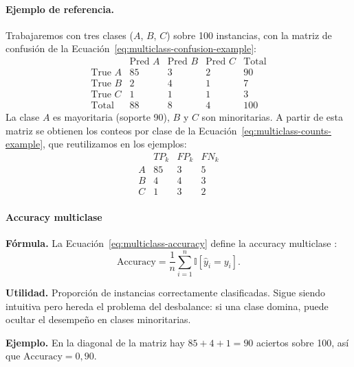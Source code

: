 \documentclass[12pt,oneside]{report}
\newcommand{\ind}{\mathbb{I}} %
\begin{document}
\paragraph{Ejemplo de referencia.} Trabajaremos con tres clases ($A$,
$B$, $C$) sobre 100 instancias, con la matriz de confusión de la Ecuación~\eqref{eq:multiclass-confusion-example}:
\begin{equation}
\label{eq:multiclass-confusion-example}
\begin{array}{l|ccc|c}
 & \text{Pred }A & \text{Pred }B & \text{Pred }C & \text{Total} \\
\hline
\text{True }A & 85 & 3 & 2 & 90 \\
\text{True }B & 2  & 4 & 1 & 7  \\
\text{True }C & 1  & 1 & 1 & 3  \\
\hline
\text{Total} & 88 & 8 & 4 & 100
\end{array}
\end{equation}
La clase $A$ es mayoritaria (soporte 90), $B$ y $C$ son minoritarias.
A partir de esta matriz se obtienen los conteos por clase de la Ecuación~\eqref{eq:multiclass-counts-example}, que
reutilizamos en los ejemplos:
\begin{equation}
\label{eq:multiclass-counts-example}
\begin{array}{l|ccc}
 & TP_k & FP_k & FN_k \\
\hline
A & 85 & 3 & 5 \\
B & 4  & 4 & 3 \\
C & 1  & 3 & 2
\end{array}
\end{equation}

\paragraph{Accuracy multiclase}

\textbf{Fórmula.} La Ecuación~\eqref{eq:multiclass-accuracy} define la accuracy multiclase \cite{sokolova_lapalme_2009}:
\begin{equation}
\label{eq:multiclass-accuracy}
\mathrm{Accuracy}=\frac{1}{n}\sum_{i=1}^{n}\ind[\hat y_i=y_i].
\end{equation}

\textbf{Utilidad.} Proporción de instancias correctamente clasificadas.
Sigue siendo intuitiva pero hereda el problema del desbalance: si una
clase domina, puede ocultar el desempeño en clases minoritarias.

\textbf{Ejemplo.} En la diagonal de la matriz hay $85+4+1=90$ aciertos
sobre 100, así que $\mathrm{Accuracy}=0{,}90$.
\end{document}
